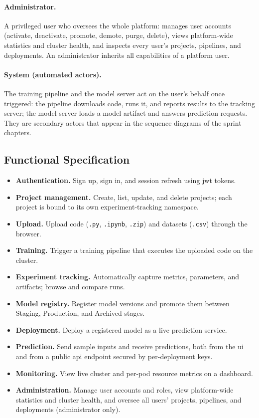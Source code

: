 \paragraph{Administrator.}
A privileged user who oversees the whole platform: manages user accounts
(activate, deactivate, promote, demote, purge, delete), views platform-wide
statistics and cluster health, and inspects every user's projects, pipelines, and
deployments. An administrator inherits all capabilities of a platform user.

\paragraph{System (automated actors).}
The training pipeline and the model server act on the user's behalf once
triggered: the pipeline downloads code, runs it, and reports results to the
tracking server; the model server loads a model artifact and answers prediction
requests. They are secondary actors that appear in the sequence diagrams of the
sprint chapters.

\subsection{Functional Specification}
\begin{itemize}[leftmargin=1.4em]
  \item \textbf{Authentication.} Sign up, sign in, and session refresh using
        \gls{jwt} tokens.
  \item \textbf{Project management.} Create, list, update, and delete projects;
        each project is bound to its own experiment-tracking namespace.
  \item \textbf{Upload.} Upload code (\texttt{.py}, \texttt{.ipynb}, \texttt{.zip})
        and datasets (\texttt{.csv}) through the browser.
  \item \textbf{Training.} Trigger a training pipeline that executes the uploaded
        code on the cluster.
  \item \textbf{Experiment tracking.} Automatically capture metrics, parameters,
        and artifacts; browse and compare runs.
  \item \textbf{Model registry.} Register model versions and promote them between
        Staging, Production, and Archived stages.
  \item \textbf{Deployment.} Deploy a registered model as a live prediction
        service.
  \item \textbf{Prediction.} Send sample inputs and receive predictions, both from
        the \gls{ui} and from a public \gls{api} endpoint secured by per-deployment
        keys.
  \item \textbf{Monitoring.} View live cluster and per-pod resource metrics on a
        dashboard.
  \item \textbf{Administration.} Manage user accounts and roles, view
        platform-wide statistics and cluster health, and oversee all users'
        projects, pipelines, and deployments (administrator only).
\end{itemize}


